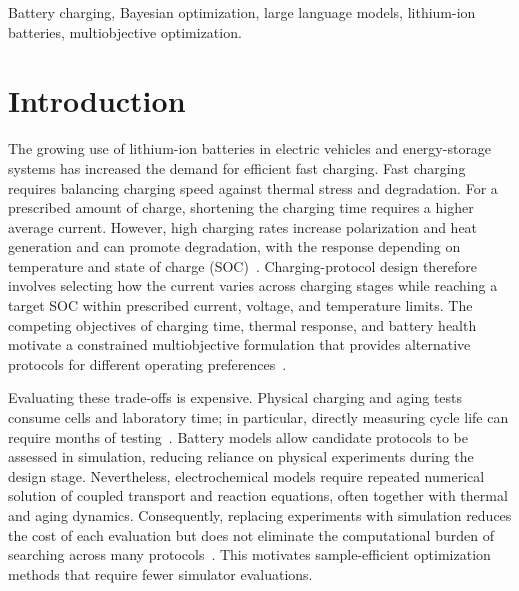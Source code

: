 \documentclass[journal,10pt]{IEEEtran}
\begin{document}
\begin{IEEEkeywords}
Battery charging, Bayesian optimization, large language models,
lithium-ion batteries, multiobjective optimization.
\end{IEEEkeywords}



\section{Introduction}
\label{sec:introduction}

The growing use of lithium-ion batteries in electric vehicles and energy-storage
systems has increased the demand for efficient fast charging. Fast charging
requires balancing charging speed against thermal stress and degradation. For a
prescribed amount of charge, shortening the charging time requires a higher
average current. However, high charging rates increase polarization and heat
generation and can promote degradation, with the response depending on
temperature and state of charge (SOC)~\cite{refFastChargeReview,refTuXFC}.
Charging-protocol design therefore involves selecting how the current varies
across charging stages while reaching a target SOC within prescribed current,
voltage, and temperature limits. The competing objectives of charging time,
thermal response, and battery health motivate a constrained multiobjective
formulation that provides alternative protocols for different operating
preferences~\cite{nref2,refFanReview,refHuMulti}.

Evaluating these trade-offs is expensive. Physical charging and aging tests
consume cells and laboratory time; in particular, directly measuring cycle
life can require months of testing~\cite{nref3}. Battery models allow candidate
protocols to be assessed in simulation, reducing reliance on physical
experiments during the design stage. Nevertheless, electrochemical models
require repeated numerical solution of coupled transport and reaction
equations, often together with thermal and aging dynamics. Consequently,
replacing experiments with simulation reduces the cost of each evaluation but
does not eliminate the computational burden of searching across many
protocols~\cite{nref7,nref8}. This motivates sample-efficient optimization
methods that require fewer simulator evaluations.
\end{document}

